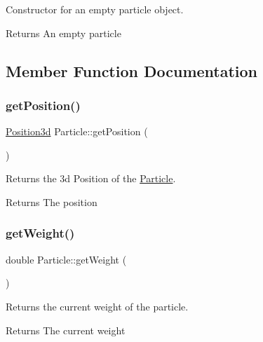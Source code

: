 Constructor for an empty particle object. 

\begin{DoxyReturn}{Returns}
An empty particle 
\end{DoxyReturn}


\subsection{Member Function Documentation}
\mbox{\label{classParticle_a804a757870822ba5d437310665cc0a0f}} 
\subsubsection{\texorpdfstring{get\+Position()}{getPosition()}}
{\footnotesize\ttfamily \hyperlink{classPosition3d}{Position3d} Particle\+::get\+Position (\begin{DoxyParamCaption}{ }\end{DoxyParamCaption})}



Returns the 3d Position of the \hyperlink{classParticle}{Particle}. 

\begin{DoxyReturn}{Returns}
The position 
\end{DoxyReturn}
\mbox{\label{classParticle_aa3394c6311c1a7d9a431d20ed565c297}} 
\subsubsection{\texorpdfstring{get\+Weight()}{getWeight()}}
{\footnotesize\ttfamily double Particle\+::get\+Weight (\begin{DoxyParamCaption}{ }\end{DoxyParamCaption})}



Returns the current weight of the particle. 

\begin{DoxyReturn}{Returns}
The current weight 
\end{DoxyReturn}
\mbox{\label{classParticle_a9bf0972f96de472f015c1812ae8e269d}} 
